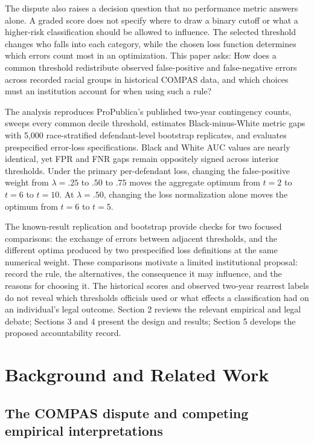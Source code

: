 \documentclass[11pt,letterpaper]{article}
\begin{document}
The dispute also raises a decision question that no performance metric answers alone. A graded score does not specify where to draw a binary cutoff or what a higher-risk classification should be allowed to influence. The selected threshold changes who falls into each category, while the chosen loss function determines which errors count most in an optimization. This paper asks: How does a common threshold redistribute observed false-positive and false-negative errors across recorded racial groups in historical COMPAS data, and which choices must an institution account for when using such a rule?

The analysis reproduces ProPublica's published two-year contingency counts, sweeps every common decile threshold, estimates Black-minus-White metric gaps with 5,000 race-stratified defendant-level bootstrap replicates, and evaluates prespecified error-loss specifications. Black and White AUC values are nearly identical, yet FPR and FNR gaps remain oppositely signed across interior thresholds. Under the primary per-defendant loss, changing the false-positive weight from $\lambda=.25$ to $.50$ to $.75$ moves the aggregate optimum from $t=2$ to $t=6$ to $t=10$. At $\lambda=.50$, changing the loss normalization alone moves the optimum from $t=6$ to $t=5$.

The known-result replication and bootstrap provide checks for two focused comparisons: the exchange of errors between adjacent thresholds, and the different optima produced by two prespecified loss definitions at the same numerical weight. These comparisons motivate a limited institutional proposal: record the rule, the alternatives, the consequence it may influence, and the reasons for choosing it. The historical scores and observed two-year rearrest labels do not reveal which thresholds officials used or what effects a classification had on an individual's legal outcome. Section 2 reviews the relevant empirical and legal debate; Sections 3 and 4 present the design and results; Section 5 develops the proposed accountability record.

\section{Background and Related Work}

\subsection{The COMPAS dispute and competing empirical interpretations}
\end{document}
